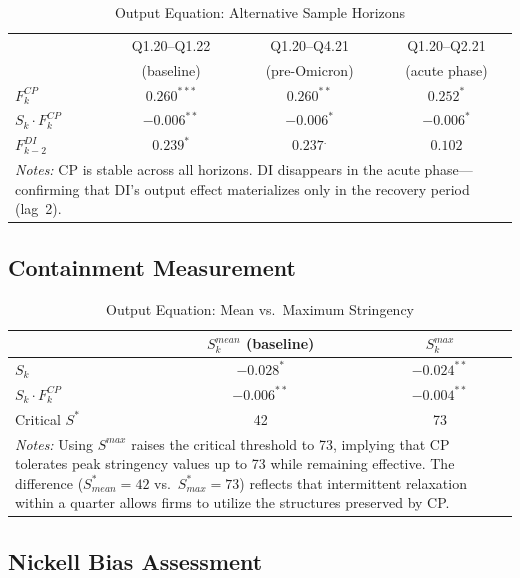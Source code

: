 \documentclass[12pt, a4paper]{article}
\begin{document}
\begin{table}[htbp]
\centering
\caption{Output Equation: Alternative Sample Horizons}
\label{tab:horizon}
\small
\begin{tabular}{lccc}
\toprule
 & Q1.20--Q1.22 & Q1.20--Q4.21 & Q1.20--Q2.21 \\
 & (baseline) & (pre-Omicron) & (acute phase) \\
\midrule
$F_k^{CP}$           & $0.260^{***}$ & $0.260^{**}$ & $0.252^{*}$ \\
$S_k \cdot F_k^{CP}$ & $-0.006^{**}$ & $-0.006^{*}$ & $-0.006^{*}$ \\
$F_{k-2}^{DI}$       & $0.239^{*}$   & $0.237^{.}$  & $0.102$ \\
\bottomrule
\multicolumn{4}{p{10cm}}{\footnotesize \textit{Notes:} CP is stable across all horizons. DI disappears in the acute phase---confirming that DI's output effect materializes only in the recovery period (lag~2).} \\
\end{tabular}
\end{table}


\subsection{Containment Measurement}

\begin{table}[htbp]
\centering
\caption{Output Equation: Mean vs.\ Maximum Stringency}
\label{tab:containment}
\small
\begin{tabular}{lcc}
\toprule
 & $S_k^{mean}$ (baseline) & $S_k^{max}$ \\
\midrule
$S_k$                 & $-0.028^{*}$  & $-0.024^{**}$ \\
$S_k \cdot F_k^{CP}$  & $-0.006^{**}$ & $-0.004^{**}$ \\
Critical $S^*$        & 42            & 73 \\
\bottomrule
\multicolumn{3}{p{9cm}}{\footnotesize \textit{Notes:} Using $S^{max}$ raises the critical threshold to 73, implying that CP tolerates peak stringency values up to 73 while remaining effective. The difference ($S^*_{mean} = 42$ vs.\ $S^*_{max} = 73$) reflects that intermittent relaxation within a quarter allows firms to utilize the structures preserved by CP.} \\
\end{tabular}
\end{table}


\subsection{Nickell Bias Assessment}
\end{document}
